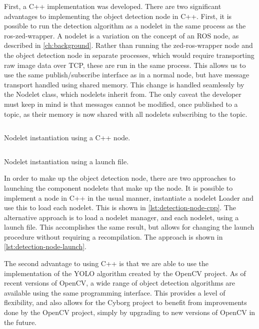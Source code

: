 \documentclass[\rootfolder/main.tex]{subfiles}
\begin{document}
First, a C++ implementation was developed.
There are two significant advantages to implementing the object detection node in C++.
First, it is possible to run the detection algorithm as a nodelet in the same process as the ros-zed-wrapper.
A nodelet is a variation on the concept of an ROS node, as described in \cref{ch:background}.
Rather than running the zed-ros-wrapper node and the object detection node in separate processes, which would require transporting raw image data over TCP, these are run in the same process.
This allows us to use the same publish/subscribe interface as in a normal node, but have message transport handled using shared memory.
This change is handled seamlessly by the Nodelet class, which nodelets inherit from.
The only caveat the developer must keep in mind is that messages cannot be modified, once published to a topic, as their memory is now shared with all nodelets subscribing to the topic.

\begin{listing}
    \inputminted{cpp}{\rootfolder/Chapters/Chapter5/Listings/object_detector_node.cpp}
    \caption{Nodelet instantiation using a C++ node.\label{lst:detection-node-cpp}}
\end{listing}

\begin{listing}
    \inputminted{xml}{\rootfolder/Chapters/Chapter5/Listings/ros_dnn.launch}
    \caption{Nodelet instantiation using a launch file.\label{lst:detection-node-launch}}
\end{listing}

In order to make up the object detection node, there are two approaches to launching the component nodelets that make up the node.
It is possible to implement a node in C++ in the usual manner, instantiate a nodelet Loader and use this to load each nodelet.
This is shown in \cref{lst:detection-node-cpp}.
The alternative approach is to load a nodelet manager, and each nodelet, using a launch file.
This accomplishes the same result, but allows for changing the launch procedure without requiring a recompilation.
The approach is shown in \cref{lst:detection-node-launch}.

The second advantage to using C++ is that we are able to use the implementation of the YOLO algorithm created by the OpenCV project.
As of recent versions of OpenCV, a wide range of object detection algorithms are available using the same programming interface.
This provides a level of flexibility, and also allows for the Cyborg project to benefit from improvements done by the OpenCV project, simply by upgrading to new versions of OpenCV in the future.
\end{document}
